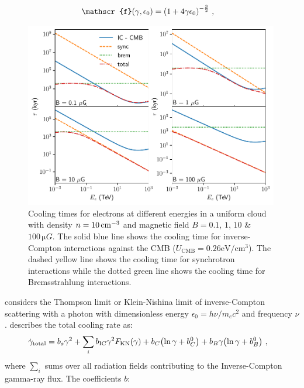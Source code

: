 \begin{equation}
    \begin{aligned}
    \mathscr{f}\qty(\gamma,\epsilon_0)&=\qty(1+4\gamma\epsilon_0)^{-\frac{3}{2}}\text{ ,}
    \end{aligned}
\end{equation}
\begin{figure}[h!]
		\includegraphics[width=0.99\textwidth]{04_Introduction/Images/non_thermal_emission/cooling_time_final.pdf}
		\caption{Cooling times for electrons at different energies in a uniform cloud with density $n=10\,\si{\per\centi\meter\cubed}$ and magnetic field $B = 0.1$, $1$, $10$ \& $100\,\si{\micro G}$. The solid blue line shows the cooling time for inverse-Compton interactions against the CMB ($U_\text{CMB}=0.26\si{\electronvolt\per\centi\meter\cubed}$). The dashed yellow line shows the cooling time for synchrotron interactions while the dotted green line shows the cooling time for Bremsstrahlung interactions.}
		\label{fig:chapter_1_non_thermal_emission_lep_cooling_losses}
\end{figure}
\noindent considers the Thompson limit or Klein-Nishina limit of inverse-Compton scattering with a photon with dimensionless energy $\epsilon_0=h\nu/m_ec^2$ and frequency $\nu$. \cite{2007A&A...474..689M} describes the total cooling rate as:
\begin{equation}
    \begin{aligned}
    \dot{\gamma}_\text{total}&=b_s\gamma^2+\sum_{i} b_\text{IC}\gamma^2F_\text{KN}\qty(\gamma)+b_C\qty(\ln \gamma+b_C^0)+b_B\gamma\qty(\ln\gamma+b_B^0) \text{ ,}
    \end{aligned} \label{eq:chapter_1_non_thermal_leptonic_cooling_rate}
\end{equation}
where $\sum_{i}$ sums over all radiation fields contributing to the Inverse-Compton gamma-ray flux. The coefficients $b$:

